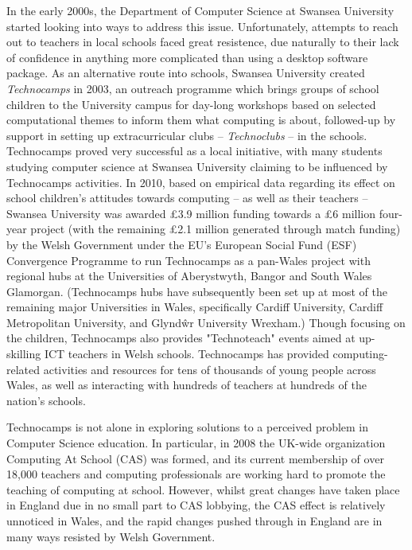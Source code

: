 \documentclass{sig-alternate}
\begin{document}
In the early 2000s, the Department of Computer Science at Swansea University
started looking into ways to address this issue.
Unfortunately, attempts to reach out to teachers in local schools
faced great resistence, due naturally to their lack of confidence
in anything more complicated than using a desktop software package.
As an alternative route into schools, Swansea University created
\emph{Technocamps} in 2003, an outreach programme which brings groups
of school children to the University campus for day-long workshops based on
selected computational themes to inform them what computing is about,
followed-up by support in setting up
extracurricular clubs -- \emph{Technoclubs} -- in the schools.
Technocamps proved very successful as a local initiative, with many
students studying computer science at Swansea University claiming to be
influenced by Technocamps activities. In 2010, based on empirical data
regarding its effect on school children's attitudes towards computing
-- as well as their teachers -- Swansea University was awarded
\pounds 3.9 million funding towards a \pounds 6 million four-year project
(with the remaining \pounds 2.1 million generated through match funding)
by the Welsh Government under the EU's European Social
Fund (ESF) Convergence Programme to run Technocamps as a pan-Wales
project with regional hubs at
the Universities of Aberystwyth, Bangor and
South Wales Glamorgan.
(Technocamps hubs have subsequently been set up at most of the remaining
major Universities in Wales, specifically Cardiff University,
Cardiff Metropolitan University, and Glynd\^wr University Wrexham.)
Though focusing on the children, Technocamps also provides "Technoteach"
events aimed at up-skilling ICT teachers in Welsh schools.
Technocamps has provided computing-related activities and resources
for tens of thousands of young people across Wales, as well as interacting
with hundreds of teachers at hundreds of the nation's schools.

Technocamps is not alone in exploring solutions to a
perceived problem in Computer Science education.
In particular, in 2008 the UK-wide
organization Computing At School (CAS) was formed, and its current
membership of over 18,000 teachers and computing professionals are
working hard to promote the teaching of computing at school.
However, whilst great changes have taken place in England
due in no small part to CAS lobbying,
the CAS effect is relatively unnoticed in Wales,
and the rapid changes pushed through in England
are in many ways resisted by Welsh Government.
\end{document}
